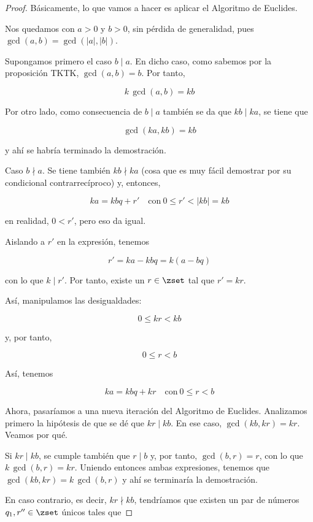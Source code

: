\begin{proof}
  Básicamente, lo que vamos a hacer es aplicar el Algoritmo de Euclides.

  Nos quedamos con $a > 0$ y $b > 0$, sin pérdida de generalidad, pues
  $\gcd(a, b) = \gcd(|a|, |b|)$.

  Supongamos primero el caso $b \mid a$. En dicho caso, como sabemos por la
  proposición TKTK, $\gcd(a, b) = b$. Por tanto,

  $$ k \, \gcd(a, b) = kb $$

  Por otro lado, como consecuencia de $b \mid a$ también se da que $kb \mid
  ka$, se tiene que

  $$ \gcd(ka, kb) = kb $$

  \noindent y ahí se habría terminado la demostración.

  Caso $b \nmid a$. Se tiene también $kb \nmid ka$ (cosa que es muy fácil
  demostrar por su condicional contrarrecíproco) y, entonces,

  $$ ka = kbq + r'  \quad \text{con} \ 0 \leq r' < |kb| = kb $$

  \noindent en realidad, $0 < r'$, pero eso da igual.

  Aislando a $r'$ en la expresión, tenemos

  $$ r' = ka - kbq = k(a - bq) $$

  \noindent con lo que $k \mid r'$. Por tanto, existe un $r \in \zset$ tal
  que $r' = kr$.

  Así, manipulamos las desigualdades:

  $$ 0 \leq kr < kb $$

  \noindent y, por tanto,

  $$ 0 \leq r < b $$

  Así, tenemos

  $$ ka = kbq + kr  \quad \text{con} \ 0 \leq r < b $$

  Ahora, pasaríamos a una nueva iteración del Algoritmo de Euclides.
  Analizamos primero la hipótesis de que se dé que $kr \mid kb$. En ese
  caso, $\gcd(kb, kr) = kr$. Veamos por qué.

  Si $kr \mid kb$, se cumple también que $r \mid b$ y, por tanto, $\gcd(b,
  r) = r$, con lo que $k \, \gcd(b, r) = kr$. Uniendo entonces ambas
  expresiones, tenemos que $\gcd(kb, kr) = k \, \gcd(b, r)$ y ahí se
  terminaría la demostración.

  En caso contrario, es decir, $kr \nmid kb$, tendríamos que existen un par
  de números $q_1, r'' \in \zset$ únicos tales que


\end{proof}
